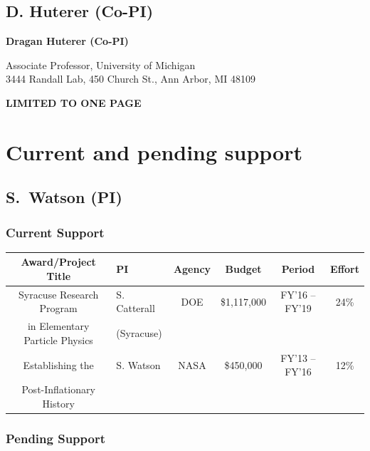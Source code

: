 \documentclass[useAMS,12pt]{article}
\begin{document}
\subsection{D. Huterer (Co-PI)}
\begin{center}
{\bf{\large Dragan Huterer (Co-PI)}}\smallskip

Associate Professor, University of Michigan\\
3444 Randall Lab, 450 Church St., Ann Arbor, MI 48109 \smallskip
\end{center}

{\bf LIMITED TO ONE PAGE}



\section{Current and pending support}

\subsection{S.\ Watson (PI)}

\subsubsection{Current Support}

\begin{center}
\begin{tabular}{|c|l|c|c|c|c|}
\hline\hline
\bf Award/Project Title & \bf PI & \bf Agency & \bf Budget &  \bf Period & \bf Effort\\
\hline
 Syracuse Research Program     & S. Catterall & DOE  & \$1,117,000 & FY{'}16 -- FY{'}19 & 24\% \\
in Elementary  Particle Physics  &  (Syracuse)  &     &&&\\
\hline
Establishing the     & S. Watson  & NASA & \$450,000 & FY{'}13 -- FY{'}16 & 12\% \\
Post-Inflationary History  &   &     &&& \\
\hline
\end{tabular}
\end{center}

\subsubsection{Pending Support}
\end{document}
